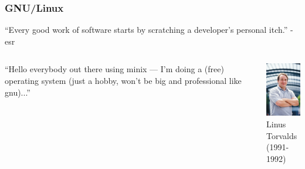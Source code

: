\documentclass{beamer}
\begin{document}
\begin{frame}
  \frametitle{GNU/Linux}
  \begin{center}
    \begin{minipage}{0.8\textwidth}
      \begin{block}{}
        \begin{center}
          “Every good work of software starts by scratching a developer's personal itch.” - esr
        \end{center}
      \end{block}
    \end{minipage}
  \end{center}
  \begin{columns}
    \column{7cm}
      ``Hello everybody out there using minix — I’m doing a (free) operating
      system (just a hobby, won’t be big and professional like gnu)...''
    \column{3cm}
    \begin{center}
      \includegraphics[width=3cm]{images/linus.jpg}\\
      Linus Torvalds\\
      (1991-1992)
    \end{center}
  \end{columns}
\end{frame}
\end{document}
